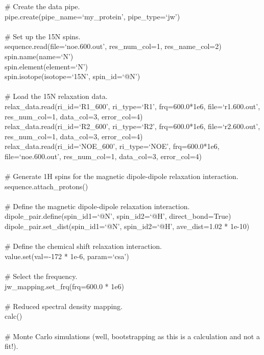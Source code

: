 \begin{exampleenv}
\# Create the data pipe. \\
pipe.create(pipe\_name=`my\_protein', pipe\_type=`jw') \\
 \\
\# Set up the 15N spins. \\
sequence.read(file=`noe.600.out', res\_num\_col=1, res\_name\_col=2) \\
spin.name(name=`N') \\
spin.element(element=`N') \\
spin.isotope(isotope=`15N', spin\_id=`@N') \\
 \\
\# Load the 15N relaxation data. \\
relax\_data.read(ri\_id=`R1\_600',  ri\_type=`R1',  frq=600.0*1e6, file=`r1.600.out', res\_num\_col=1, data\_col=3, error\_col=4) \\
relax\_data.read(ri\_id=`R2\_600',  ri\_type=`R2',  frq=600.0*1e6, file=`r2.600.out', res\_num\_col=1, data\_col=3, error\_col=4) \\
relax\_data.read(ri\_id=`NOE\_600', ri\_type=`NOE', frq=600.0*1e6, file=`noe.600.out', res\_num\_col=1, data\_col=3, error\_col=4) \\
 \\
\# Generate 1H spins for the magnetic dipole-dipole relaxation interaction. \\
sequence.attach\_protons() \\
 \\
\# Define the magnetic dipole-dipole relaxation interaction. \\
dipole\_pair.define(spin\_id1=`@N', spin\_id2=`@H', direct\_bond=True) \\
dipole\_pair.set\_dist(spin\_id1=`@N', spin\_id2=`@H', ave\_dist=1.02 * 1e-10) \\
 \\
\# Define the chemical shift relaxation interaction. \\
value.set(val=-172 * 1e-6, param=`csa') \\
 \\
\# Select the frequency. \\
jw\_mapping.set\_frq(frq=600.0 * 1e6) \\
 \\
\# Reduced spectral density mapping. \\
calc() \\
 \\
\# Monte Carlo simulations (well, bootstrapping as this is a calculation and not a fit!). \\

\end{exampleenv}
